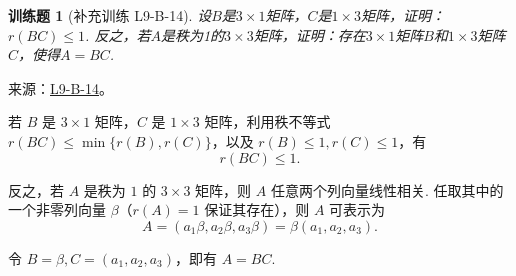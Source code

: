 \documentclass[UTF8,12pt,a4paper,fontset=fandol]{ctexart}
\newtheorem{exercise}{训练题}[section]
\begin{document}
\begin{exercise}[补充训练 L9-B-14]\label{prob:L9-B-14}
设$B$是$3 \times 1$矩阵，$C$是$1 \times 3$矩阵，证明：$r(BC) \leqslant 1$. 反之，若$A$是秩为1的$3 \times 3$矩阵，证明：存在$3 \times 1$矩阵$B$和$1 \times 3$矩阵$C$，使得$A = BC$.
\end{exercise}
\noindent 来源：\href{https://github.com/yhwu-is/Linear-Algebra-Left-Undone/blob/new/%E8%AE%B2%E4%B9%89/%E4%B8%93%E9%A2%98/9%20%E7%9F%A9%E9%98%B5%E8%BF%90%E7%AE%97%E8%BF%9B%E9%98%B6.tex}{L9-B-14}。
\begin{solve}
若 $B$ 是 $3 \times 1$ 矩阵，$C$ 是 $1 \times 3$ 矩阵，利用秩不等式 $r(BC) \leqslant \min\{r(B), r(C)\}$，以及 $r(B) \leqslant 1, r(C) \leqslant 1$，有
            \[
                r(BC) \leqslant 1.
            \]

            反之，若 $A$ 是秩为 $1$ 的 $3 \times 3$ 矩阵，则 $A$ 任意两个列向量线性相关. 任取其中的一个非零列向量 $\beta$（$r(A)=1$ 保证其存在），则 $A$ 可表示为
            \[
                A = (a_1 \beta, a_2 \beta, a_3 \beta) = \beta (a_1 , a_2 , a_3).
            \]

            令 $B = \beta, C = (a_1 , a_2 , a_3)$，即有 $A = BC$.
\end{solve}
\end{document}
